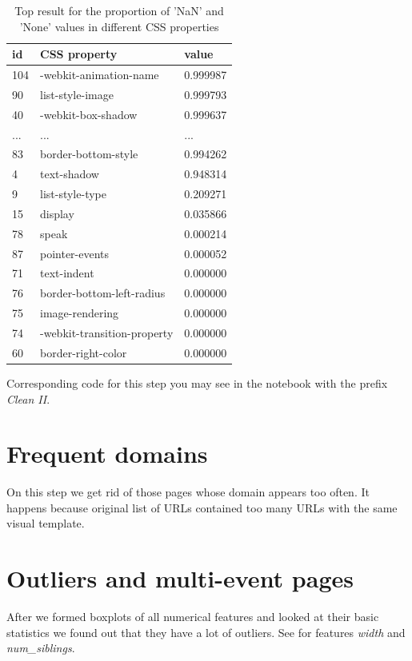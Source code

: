 \begin{table}[h]
\begin{center}
{\renewcommand{\arraystretch}{1.5}
\begin{tabular}{| p{2cm} | p{5cm}| p{3cm} |}
\hline
\textbf{id}	&	\textbf{CSS property}	&	\textbf{value} \\
\hline
104	&	-webkit-animation-name	&	0.999987 \\
\hline
90	&	list-style-image	&	0.999793 \\
\hline
40	&	-webkit-box-shadow	&	0.999637 \\
\hline
...	&	...	&	... \\
\hline
83	&	border-bottom-style	&	0.994262 \\
\hline
4	&	text-shadow	&	0.948314 \\
\hline
9	&	list-style-type	&	0.209271 \\
\hline
15	&	display	&	0.035866 \\
\hline
78	&	speak	&	0.000214 \\
\hline
87	&	pointer-events	&	0.000052 \\
\hline
71	&	text-indent	&	0.000000 \\
\hline
76	&	border-bottom-left-radius	&	0.000000 \\
\hline
75	&	image-rendering	&	0.000000 \\
\hline
74	&	-webkit-transition-property	&	0.000000 \\
\hline
60	&	border-right-color	&	0.000000 \\
\hline
\end{tabular}}
\caption{Top result for the proportion of 'NaN' and 'None' values in different CSS properties }
\label{table:cssnan}
\end{center}
\end{table}


Corresponding code for this step you may see in the notebook with the prefix \textit{Clean II}.

\section*{Frequent domains}
On this step we get rid of those pages whose domain appears too often. It happens because original list of URLs contained too many URLs with the same visual template.   

\section*{Outliers and multi-event pages}
After we formed boxplots of all numerical features and looked at their basic statistics we found out that they have a lot of outliers. See  for features \textit{width} and \textit{num\_siblings}.\\

